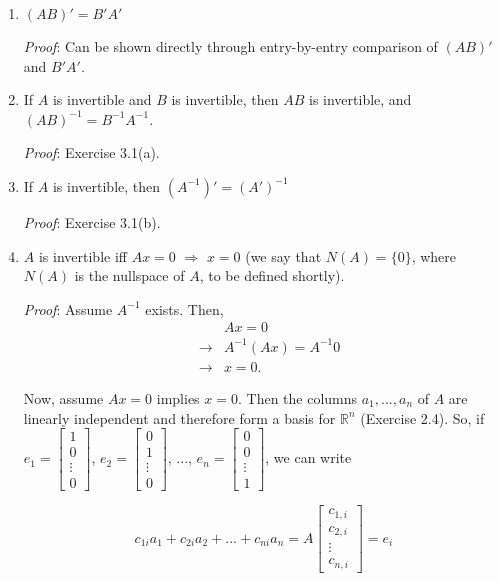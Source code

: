 \documentclass[12pt,oneside]{article}
\begin{document}
\begin{enumerate}
\item $(AB)' = B' A'$

\emph{Proof}: Can be shown directly through entry-by-entry comparison of $(AB)'$ and $B'A'$.

\item If $A$ is invertible and $B$ is invertible, then $AB$ is invertible, and $(AB)^{-1} = B^{-1}A^{-1}$.

\emph{Proof}: Exercise 3.1(a).

\item If $A$ is invertible, then $(A^{-1})' = (A')^{-1}$

\emph{Proof}: Exercise 3.1(b).

\item $A$ is invertible iff  $Ax = 0$
  $\Longrightarrow$ $x = 0$ (we say that $N(A) = \{0\}$, where $N(A)$
  is the nullspace of $A$, to be defined shortly).

\emph{Proof}: Assume $A^{-1}$ exists.  Then,
\begin{eqnarray*}&& Ax = 0 \\ &\rightarrow& A^{-1}(Ax) = A^{-1}0 \\ &\rightarrow& x = 0. \end{eqnarray*}

Now, assume $Ax = 0$ implies $x=0$.  Then the columns ${a_1,...,a_n}$ of $A$ are linearly independent and therefore form a basis for $\mathbb{R}^{n}$ (Exercise 2.4).  So, if \\ $e_1 = \left[ \begin{array} {c} 1 \\ 0 \\ \vdots \\ 0 \end{array} \right]$, $ e_2 = \left[\begin{array} {c} 0 \\ 1 \\ \vdots \\ 0 \end{array} \right]$, ..., $e_n = \left[\begin{array} {c} 0 \\ 0 \\ \vdots \\ 1 \end{array} \right]$, we can write

\[c_{1i}a_1+c_{2i}a_2+...+c_{ni}a_n = A \left[ \begin{array} {c} c_{1,i} \\ c_{2,i} \\ \vdots \\ c_{n,i} \end{array} \right] = e_i \]


\end{enumerate}
\end{document}
